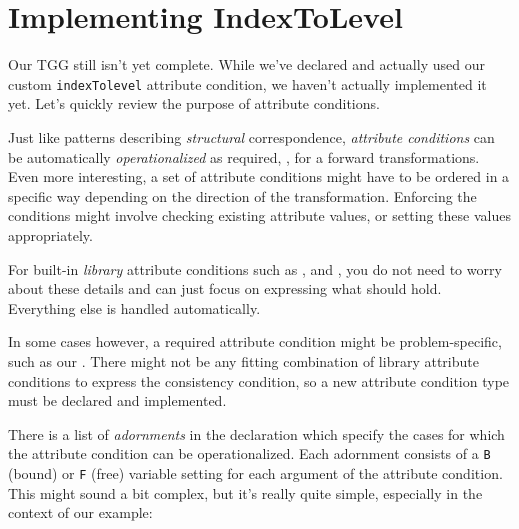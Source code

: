 \hypertarget{subsec:IndexToLevel}{}
\section{Implementing IndexToLevel}
\genHeader

Our TGG still isn't yet complete. 
While we've declared and actually used our custom \texttt{indexTolevel} attribute condition, we haven't actually implemented it yet. 
Let's quickly review the purpose of attribute conditions.

Just like patterns describing \emph{structural} correspondence, \emph{attribute conditions} can be automatically \emph{operationalized} as required, \eg, for a forward transformations. 
Even more interesting, a set of attribute conditions might have to be ordered in a specific way depending on the direction of the transformation.
Enforcing the conditions might involve checking existing attribute values, or setting these values appropriately.

For built-in \emph{library} attribute conditions such as ,  and , you do not need to worry about these details and can just focus
on expressing what should hold. 
Everything else is handled automatically.

In some cases however, a required attribute condition might be problem-specific, such as our . 
There might not be any fitting combination of library attribute conditions to express the consistency condition, so a new attribute condition type must be declared and implemented.

There is a list of \emph{adornments} in the declaration which specify the cases for which the attribute condition can be operationalized. 
Each adornment consists of a \texttt{B} (bound) or \texttt{F} (free) variable setting for each argument of the attribute condition. 
This might sound a bit complex, but it's really quite simple, especially in the context of our example:

